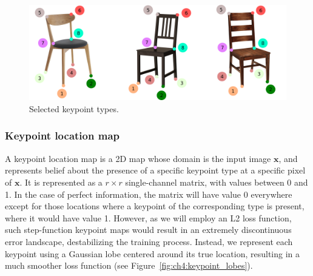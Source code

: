 \documentclass[10pt,twocolumn,letterpaper]{article}
\newcommand{\bb}[1]{{\bm{#1}}}
\begin{document}
\begin{figure}[h!tb]
    \includegraphics[width=\linewidth]{figures/keypoint_types/keypoint_types}
    \caption[Keypoint types]{Selected keypoint types.}
    \label{fig:ch4:keypoint_types}
\end{figure}

%

\subsubsection{Keypoint location map}
A keypoint location map is a 2D map whose domain is the input image $\bb{x}$, and
represents belief about the presence of a specific keypoint type at a specific
pixel of $\bb{x}$. It is represented as a $r \times r$ single-channel
matrix, with values between 0 and 1. In the case of perfect information, the matrix will have
value 0 everywhere except for those locations where a keypoint of the
corresponding type is present, where it would have value 1. However, as we will employ
an L2 loss function, such step-function keypoint maps would result in an extremely
discontinuous error landscape, destabilizing the training process.  Instead, we
represent each keypoint using a Gaussian lobe centered around its true location,
 resulting in a much smoother loss function (see Figure~\ref{fig:ch4:keypoint_lobes}).
\end{document}
